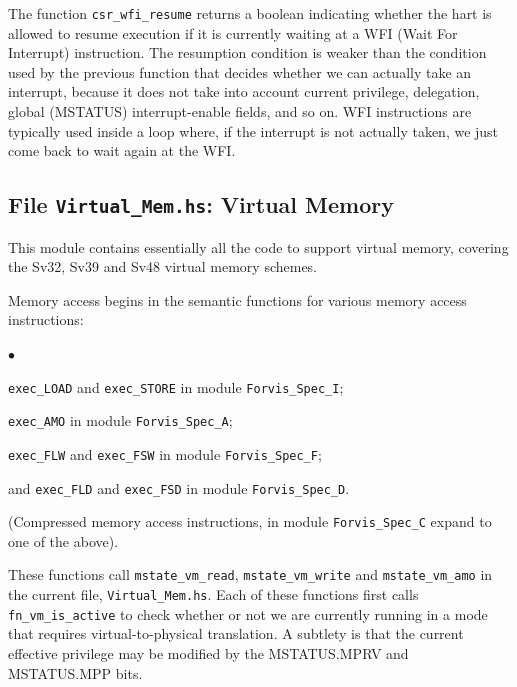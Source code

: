 \documentclass[11pt]{article}
\newenvironment{tightlist}%
{\begin{list}{$\bullet$}{%
    \setlength{\topsep}{0in}
    \setlength{\partopsep}{0in}
    \setlength{\itemsep}{0in}
    \setlength{\parsep}{0in}
    \setlength{\leftmargin}{1.5em}
    \setlength{\rightmargin}{0in}
    \setlength{\itemindent}{0in}
}
}%
{\end{list}
}
\begin{document}
The function \verb|csr_wfi_resume| returns a boolean indicating
whether the hart is allowed to resume execution if it is currently
waiting at a WFI (Wait For Interrupt) instruction.  The resumption
condition is weaker than the condition used by the previous function
that decides whether we can actually take an interrupt, because it
does not take into account current privilege, delegation, global
(MSTATUS) interrupt-enable fields, and so on.  WFI instructions are
typically used inside a loop where, if the interrupt is not actually
taken, we just come back to wait again at the WFI.


\subsection{File {\tt Virtual\_Mem.hs}: Virtual Memory}

\label{sec_vm}

This module contains essentially all the code to support virtual
memory, covering the Sv32, Sv39 and Sv48 virtual memory schemes.

Memory access begins in the semantic functions for various memory
access instructions:

\begin{tightlist}

\item \verb|exec_LOAD| and \verb|exec_STORE| in module \verb|Forvis_Spec_I|;

\item \verb|exec_AMO| in module \verb|Forvis_Spec_A|;

\item \verb|exec_FLW| and \verb|exec_FSW| in module \verb|Forvis_Spec_F|;

\item and \verb|exec_FLD| and \verb|exec_FSD| in module \verb|Forvis_Spec_D|.

\item (Compressed memory access instructions, in module
\verb|Forvis_Spec_C| expand to one of the above).

\end{tightlist}

These functions call \verb|mstate_vm_read|, \verb|mstate_vm_write| and
\verb|mstate_vm_amo| in the current file, \verb|Virtual_Mem.hs|.  Each
of these functions first calls \verb|fn_vm_is_active| to check whether
or not we are currently running in a mode that requires
virtual-to-physical translation.  A subtlety is that the current
effective privilege may be modified by the MSTATUS.MPRV and
MSTATUS.MPP bits.
\end{document}
